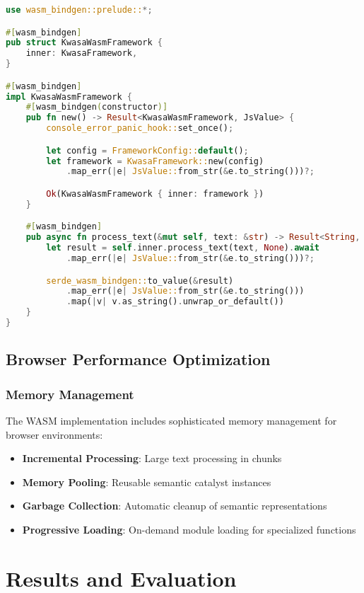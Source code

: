 \documentclass[12pt,a4paper,twoside]{article}
\begin{document}
\begin{itemize}
\begin{lstlisting}[language=rust,caption=WebAssembly Integration]
use wasm_bindgen::prelude::*;

#[wasm_bindgen]
pub struct KwasaWasmFramework {
    inner: KwasaFramework,
}

#[wasm_bindgen]
impl KwasaWasmFramework {
    #[wasm_bindgen(constructor)]
    pub fn new() -> Result<KwasaWasmFramework, JsValue> {
        console_error_panic_hook::set_once();

        let config = FrameworkConfig::default();
        let framework = KwasaFramework::new(config)
            .map_err(|e| JsValue::from_str(&e.to_string()))?;

        Ok(KwasaWasmFramework { inner: framework })
    }

    #[wasm_bindgen]
    pub async fn process_text(&mut self, text: &str) -> Result<String, JsValue> {
        let result = self.inner.process_text(text, None).await
            .map_err(|e| JsValue::from_str(&e.to_string()))?;

        serde_wasm_bindgen::to_value(&result)
            .map_err(|e| JsValue::from_str(&e.to_string()))
            .map(|v| v.as_string().unwrap_or_default())
    }
}
\end{lstlisting}

\subsection{Browser Performance Optimization}

\subsubsection{Memory Management}

The WASM implementation includes sophisticated memory management for browser environments:

\begin{itemize}
\item \textbf{Incremental Processing}: Large text processing in chunks
\item \textbf{Memory Pooling}: Reusable semantic catalyst instances
\item \textbf{Garbage Collection}: Automatic cleanup of semantic representations
\item \textbf{Progressive Loading}: On-demand module loading for specialized functions
\end{itemize}

\section{Results and Evaluation}


\end{itemize}
\end{document}
